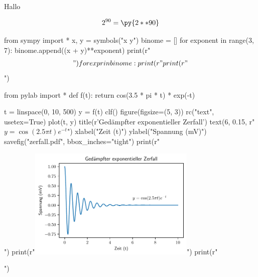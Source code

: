 \documentclass[12pt,ngerman]{scrartcl}
\begin{document}
Hallo


\[
2^{90}=\py{2**90}
\]


\begin{pycode}
from sympy import *
x, y = symbols("x y")
binome = []
for exponent in range(3, 7):
    binome.append((x + y)**exponent)
    print(r"\begin{align*}")
    for expr in binome:
        print(r"%
    print(r"\end{align*}")
\end{pycode}

\begin{pycode}
from pylab import *
def f(t):
    return cos(3.5 * pi * t) * exp(-t)

t = linspace(0, 10, 500)
y = f(t)
clf()
figure(figsize=(5, 3))
rc("text", usetex=True)
plot(t, y)
title(r'Ged\"ampfter exponentieller Zerfall') 
text(6, 0.15, r"$y = \cos(2.5 \pi t) e^{-t}$")
xlabel("Zeit (t)")
ylabel("Spannung (mV)")
savefig("zerfall.pdf", bbox_inches="tight")
print(r"\begin{center}")
print(r"\includegraphics[width=0.6\textwidth]{zerfall.pdf}")
print(r"\end{center}")
\end{pycode}
\end{document}
